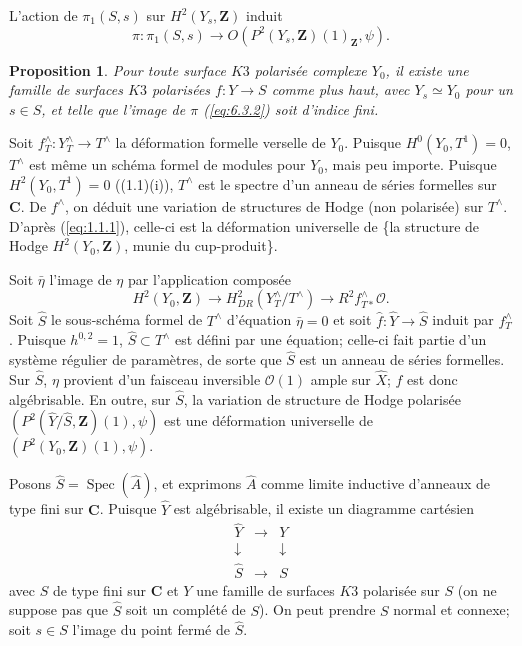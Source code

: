 \documentclass[11pt]{amsart}
\theoremstyle{plain}
\newtheorem{proposition}[theoreme]{Proposition}
\theoremstyle{definition}
\theoremstyle{remark}
\begin{document}
L'action de $\pi_1(S,s)$ sur $H^2(Y_s,\mathbf{Z})$ induit
\begin{equation}\label{eq:6.3.2}
\pi\colon\pi_1(S,s)\to O(P^2(Y_s,\mathbf{Z})(1)_\mathbf{Z},\psi).
\end{equation}

\begin{proposition}\label{prop:6.4}
Pour toute surface $K3$ polaris\'ee complexe $Y_0$, il existe une famille de surfaces $K3$ polaris\'ees $f\colon Y\to S$ comme plus haut, avec $Y_s\simeq Y_0$ pour un $s\in S$, et telle que l'image de $\pi$ \textup{(}\ref{eq:6.3.2}\textup{)} soit d'indice fini.
\end{proposition}

Soit $f_T^\wedge\colon Y_T^\wedge\to T^\wedge$ la d\'eformation formelle verselle de $Y_0$. Puisque $H^0(Y_0,T^1)=0$, $T^\wedge$ est m\^eme un sch\'ema formel de modules pour $Y_0$, mais peu importe. Puisque $H^2(Y_0,T^1)=0$ ((1.1)(i)), $T^\wedge$ est le spectre d'un anneau de s\'eries formelles sur $\mathbf{C}$. De $f^\wedge$, on d\'eduit une variation de structures de Hodge (non polaris\'ee) sur $T^\wedge$. D'apr\`es (\ref{eq:1.1.1}), celle-ci est la d\'eformation universelle de \{la structure de Hodge $H^2(Y_0,\mathbf{Z})$, munie du cup-produit\}.

Soit $\bar{\eta}$ l'image de $\eta$ par l'application compos\'ee
\begin{equation*}
H^2(Y_0,\mathbf{Z})\longrightarrow H^2_{DR}(Y_T^\wedge/T^\wedge)\longrightarrow R^2f_{T*}^\wedge\mathcal{O}.
\end{equation*}
Soit $\hat{S}$ le sous-sch\'ema formel de $T^\wedge$ d'\'equation $\bar{\eta}=0$ et soit $\hat{f}\colon\hat{Y}\to\hat{S}$ induit par $f_T^\wedge$. Puisque $h^{0,2}=1$, $\hat{S}\subset T^\wedge$ est d\'efini par une \'equation; celle-ci fait partie d'un syst\`eme r\'egulier de param\`etres, de sorte que $\hat{S}$ est un anneau de s\'eries formelles. Sur $\hat{S}$, $\eta$ provient d'un faisceau inversible $\mathcal{O}(1)$ ample sur $\hat{X}$; $\hat{f}$ est donc alg\'ebrisable. En outre, sur $\hat{S}$, la variation de structure de Hodge polaris\'ee $(P^2(\hat{Y}/\hat{S},\mathbf{Z})(1),\psi)$ est une d\'eformation universelle de $(P^2(Y_0,\mathbf{Z})(1),\psi)$.

Posons $\hat{S}=\operatorname{Spec}(\hat{A})$, et exprimons $\hat{A}$ comme limite inductive d'anneaux de type fini sur $\mathbf{C}$. Puisque $\hat{Y}$ est alg\'ebrisable, il existe un diagramme cart\'esien
\begin{equation*}
\begin{array}{ccc}
\hat{Y} & \to & Y \\
\downarrow & & \downarrow \\
\hat{S} & \to & S
\end{array}
\end{equation*}
avec $S$ de type fini sur $\mathbf{C}$ et $Y$ une famille de surfaces $K3$ polaris\'ee sur $S$ (on ne suppose pas que $\hat{S}$ soit un compl\'et\'e de $S$). On peut prendre $S$ normal et connexe; soit $s\in S$ l'image du point ferm\'e de $\hat{S}$.
\end{document}
